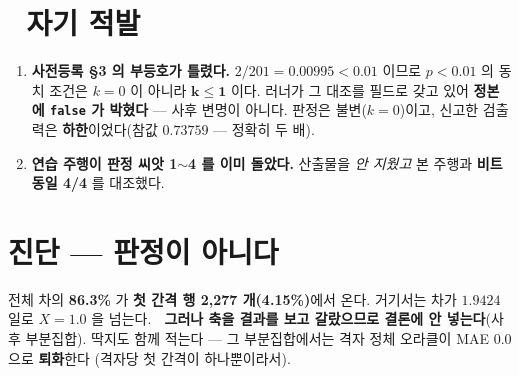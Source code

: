 \documentclass{article}
\begin{document}
\section{🔴 자기 적발}

\begin{enumerate}
\item \textbf{사전등록 \S3 의 부등호가 틀렸다.} $2/201=0.00995<0.01$ 이므로
$p<0.01$ 의 동치 조건은 $k=0$ 이 아니라 $\mathbf{k\le 1}$ 이다.
러너가 그 대조를 필드로 갖고 있어 \textbf{정본에 \texttt{false} 가 박혔다} --- 사후 변명이 아니다.
판정은 불변($k=0$)이고, 신고한 검출력은 \textbf{하한}이었다(참값 $0.73759$ --- 정확히 두 배).
\item \textbf{연습 주행이 판정 씨앗 1$\sim$4 를 이미 돌았다.}
산출물을 \emph{안 지웠고} 본 주행과 \textbf{비트 동일 4/4} 를 대조했다.
\end{enumerate}

\section{진단 --- 판정이 아니다}

전체 차의 \textbf{86.3\%} 가 \textbf{첫 간격 행 2{,}277 개(4.15\%)}에서 온다.
거기서는 차가 $\mathbf{1.9424}$ 일로 $X=1.0$ 을 넘는다.
🔴 \textbf{그러나 축을 결과를 보고 갈랐으므로 결론에 안 넣는다}(사후 부분집합).
딱지도 함께 적는다 --- 그 부분집합에서는 격자 정체 오라클이 MAE $0.0$ 으로 \textbf{퇴화}한다
(격자당 첫 간격이 하나뿐이라서).
\end{document}
